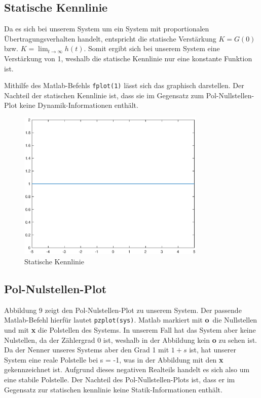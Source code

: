 \subsection{Statische Kennlinie}

Da es sich bei unserem System um ein System mit proportionalen Übertragungsverhalten handelt, entspricht die statische Verstärkung $K = G(0)$ bzw. $K = \lim_{t\to \infty} h(t)$. 
Somit ergibt sich bei unserem System eine Verstärkung von 1, weshalb die statische Kennlinie nur eine konstante Funktion ist. 

Mithilfe des Matlab-Befehls \texttt{fplot(1)} lässt sich das graphisch darstellen. Der Nachteil der statischen Kennlinie ist, dass sie im Gegensatz zum Pol-Nullstellen-Plot keine Dynamik-Informationen enthält.


\begin{figure}[H]
    \label{fig:staticCurve}
    \centering
    \includegraphics[width=0.8\textwidth]{Bilder/StaticCurvePT1Tt.eps}
    \caption{Statische Kennlinie}
 \end{figure}

\subsection{Pol-Nulstellen-Plot}
Abbildung 9 zeigt den Pol-Nulstellen-Plot zu unserem System. Der passende Matlab-Befehl hierfür lautet \texttt{pzplot(sys)}. Matlab markiert mit \textbf{o} die Nullstellen und mit \textbf{x} die Polstellen des Systems. In unserem Fall hat das System aber keine Nulstellen, da der Zählergrad 0 ist, weshalb in der Abbildung kein \textbf{o} zu sehen ist. Da der Nenner unseres Systems aber den Grad 1 mit $1 + s$ ist, hat unserer System eine reale Polstelle bei s = -1, was in der Abbildung mit den \textbf{x} gekennzeichnet ist. Aufgrund dieses negativen Realteils handelt es sich also um eine stabile Polstelle.
Der Nachteil des Pol-Nullstellen-Plots ist, dass er im Gegensatz zur statischen kennlinie keine Statik-Informationen enthält.

